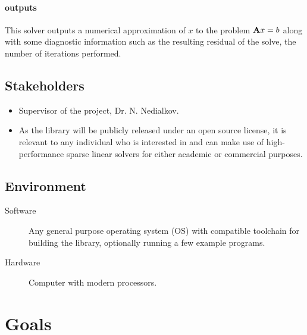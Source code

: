 \documentclass{article}
\begin{document}
\paragraph{outputs}

This solver outputs a numerical approximation of \(x\) to the problem
\(\mathbf{A}x = b\) along with some diagnostic information such as the resulting
residual of the solve, the number of iterations performed.

\subsection{Stakeholders}

\begin{itemize}
\item Supervisor of the project, Dr. N. Nedialkov.
\item As the library will be publicly released under an open source license, it is
  relevant to any individual who is interested in and can make use of
  high-performance sparse linear solvers for either academic or commercial
  purposes.
\end{itemize}

\subsection{Environment}


\begin{description}
\item[Software] Any general purpose operating system (OS) with compatible toolchain
  for building the library, optionally running a few example programs.
\item[Hardware] Computer with modern processors.
\end{description}

\section{Goals}
\end{document}
